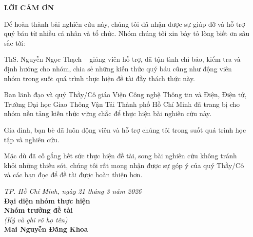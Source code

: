 \begin{center}
    {\fontsize{14}{17}\selectfont\bfseries LỜI CẢM ƠN}
\end{center}

\vspace{20pt}
\setlength{\parindent}{1.25cm}
\setlength{\parskip}{0.3em}

Để hoàn thành bài nghiên cứu này, chúng tôi đã nhận được sự giúp đỡ và hỗ trợ quý báu từ nhiều cá nhân và tổ chức. Nhóm chúng tôi xin bày tỏ lòng biết ơn sâu sắc tới:


\setlength{\itemsep}{0.5em}

 ThS. Nguyễn Ngọc Thạch -- giảng viên hỗ trợ, đã tận tình chỉ bảo, kiểm tra và định hướng cho nhóm, chia sẻ những kiến thức quý báu cũng như động viên nhóm trong suốt quá trình thực hiện đề tài đầy thách thức này.

Ban lãnh đạo và quý Thầy/Cô giáo Viện Công nghệ Thông tin và Điện, Điện tử, Trường Đại học Giao Thông Vận Tải Thành phố Hồ Chí Minh đã trang bị cho nhóm nền tảng kiến thức vững chắc để thực hiện bài nghiên cứu này.

Gia đình, bạn bè đã luôn động viên và hỗ trợ chúng tôi trong suốt quá trình học tập và nghiên cứu.

Mặc dù đã cố gắng hết sức thực hiện đề tài, song bài nghiên cứu không tránh khỏi những thiếu sót, chúng tôi rất mong nhận được sự góp ý của quý Thầy/Cô và các bạn đọc để đề tài được hoàn thiện hơn.



\vspace{1cm}

\begin{flushright}
\textit{TP. Hồ Chí Minh, ngày 21 tháng 3 năm 2026}\\[0.3cm]
\textbf{Đại diện nhóm thực hiện}\\[0.3cm]
\textbf{Nhóm trưởng đề tài}\\[0.3cm]
\textit{(Ký và ghi rõ họ tên)}\\
\vspace{2cm}
\textbf{Mai Nguyễn Đăng Khoa}
\end{flushright}